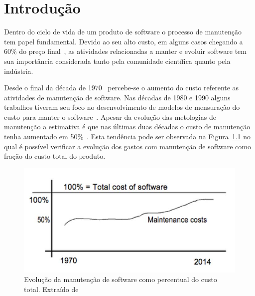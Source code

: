 \chapter{Introdução}
\label{ch:intro}

Dentro do ciclo de vida de um produto de software o processo de manutenção tem
papel fundamental. Devido ao seu alto custo, em alguns casos chegando a 60\% do
preço final~\cite{kaur2015review}, as atividades relacionadas a manter e evoluir
software tem sua importância considerada tanto pela comunidade científica quanto
pela indústria.

Desde o final da década de 1970~\cite{Zelkowitz:1979:PSE:578504} percebe-se o
aumento do custo referente as atividades de  manutenção de software. Nas décadas
de 1980 e 1990 alguns trabalhos tiveram seu foco no desenvolvimento de modelos
de mensuração do custo para manter o
software~\cite{Herrin:1985:SMC:323287.323383,hirota1994approach}. Apesar da
evolução das metologias de manutenção a estimativa é que nas últimas duas
décadas o custo de manutenção tenha aumentado em
50\%~\cite{koskinen2010software}. Esta tendência pode ser observada na
Figura~\ref{fig:software-maintence-costs} no qual é possível verificar a
evolução dos gastos com manutenção de software como fração do custo total do
produto.

\begin{figure}[htpb] 
\centering
\includegraphics[width=0.7\linewidth]
				{./chapter-intro/img/software-maintence-costs}
\caption{Evolução da manutenção de software como percentual do custo total.
	Extraído de~\cite{engelbertink2010save}}
\label{fig:software-maintence-costs}
\end{figure}

